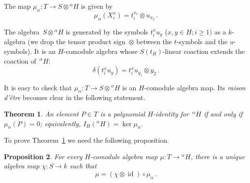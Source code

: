 \documentclass[11pt, a4paper]{amsart}
\newtheorem{theorem}{Theorem}[section]
\newtheorem{prop}[theorem]{Proposition}
\theoremstyle{definition}
\numberwithin{equation}{section}
\begin{document}
The map $\mu_{\alpha}: T \to S \otimes {}^{\alpha} H$ is given by
\begin{equation}\label{mu}
\mu_{\alpha}(X_i^x) = t_i^{x_1} \otimes u_{x_2} \, .
\end{equation}

The algebra~$S \otimes {}^{\alpha}H$ is generated by the symbols $t_i^x u_y$ ($x,y \in H; i\geq 1)$ as a $k$-algebra
(we drop the tensor product sign~$\otimes$ between the $t$-symbols and the $u$-symbols). 
It is an $H$-comodule algebra whose $S(t_H)$-linear coaction extends the coaction of~${}^{\alpha}H$:
\begin{equation*}
\delta(t_i^x u_y) = t_i^x u_{y_1} \otimes y_2 \, .
\end{equation*}

It is easy to check that $\mu_{\alpha}: T \to S \otimes {}^{\alpha} H$ is an $H$-comodule algebra map.
Its \emph{raison d'\^etre} becomes clear in the following statement.

\begin{theorem}\label{detect}
An element $P \in T$ is a polynomial $H$-identity for~${}^{\alpha} H$ 
if and only if $\mu_{\alpha}(P) = 0$; equivalently,
$I_H({}^{\alpha} H) = \ker \mu_{\alpha}$.
\end{theorem}

To prove Theorem~\ref{detect} we need the following proposition.

\begin{prop}\label{lem-mu-univ}
For every $H$-comodule algebra map $\mu : T \to {}^{\alpha} H$, 
there is a unique algebra map $\chi : S \to k$ such that 
\[
\mu = (\chi \otimes \operatorname{id}) \circ \mu_{\alpha} \, .
\]
\end{prop}
\end{document}

